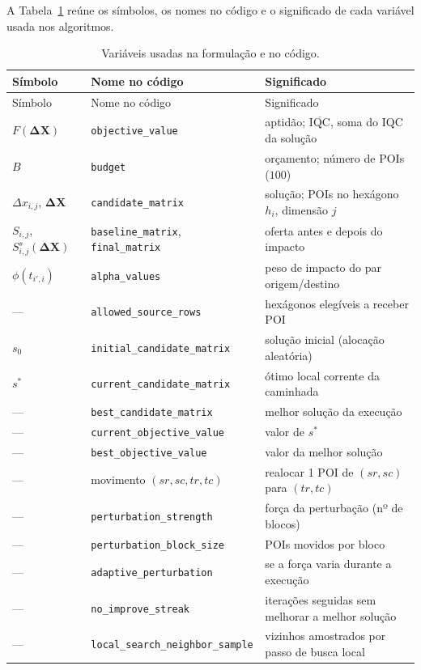 \documentclass[11pt,a4paper]{article}
\newcommand{\code}[1]{\texttt{#1}}
\begin{document}
A Tabela~\ref{tab:glossario} reúne os símbolos, os nomes no código e o significado de cada variável usada nos algoritmos.

\renewcommand{\arraystretch}{1.25}
\begin{longtable}{@{}p{2.6cm} p{4.4cm} p{7.2cm}@{}}
\caption{Variáveis usadas na formulação e no código.}\label{tab:glossario}\\
\toprule
Símbolo & Nome no código & Significado \\
\midrule
\endfirsthead
\toprule
Símbolo & Nome no código & Significado \\
\midrule
\endhead
$F(\mathbf{\Delta X})$ & \code{objective\_value} & aptidão; $\overline{\mathrm{IQC}}$, soma do IQC da solução \\
$B$ & \code{budget} & orçamento; número de POIs ($100$) \\
$\Delta x_{i,j}$, $\mathbf{\Delta X}$ & \code{candidate\_matrix} & solução; POIs no hexágono $h_i$, dimensão $j$ \\
$S_{i,j}$, $S^s_{i,j}(\mathbf{\Delta X})$ & \code{baseline\_matrix}, \code{final\_matrix} & oferta antes e depois do impacto \\
$\phi(t_{i',i})$ & \code{alpha\_values} & peso de impacto do par origem/destino \\
--- & \code{allowed\_source\_rows} & hexágonos elegíveis a receber POI \\
$s_0$ & \code{initial\_candidate\_matrix} & solução inicial (alocação aleatória) \\
$s^\ast$ & \code{current\_candidate\_matrix} & ótimo local corrente da caminhada \\
--- & \code{best\_candidate\_matrix} & melhor solução da execução \\
--- & \code{current\_objective\_value} & valor de $s^\ast$ \\
--- & \code{best\_objective\_value} & valor da melhor solução \\
--- & movimento $(sr,sc,tr,tc)$ & realocar 1 POI de $(sr,sc)$ para $(tr,tc)$ \\
--- & \code{perturbation\_strength} & força da perturbação (nº de blocos) \\
--- & \code{perturbation\_block\_size} & POIs movidos por bloco \\
--- & \code{adaptive\_perturbation} & se a força varia durante a execução \\
--- & \code{no\_improve\_streak} & iterações seguidas sem melhorar a melhor solução \\
--- & \code{local\_search\_neighbor\_sample} & vizinhos amostrados por passo de busca local \\

\end{longtable}
\end{document}
